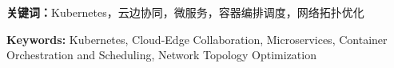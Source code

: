 \cleardoublepage
{}


\textbf{关键词：}Kubernetes，云边协同，微服务，容器编排调度，网络拓扑优化

\cleardoublepage
{}


\textbf{Keywords:} Kubernetes, Cloud-Edge Collaboration, Microservices, Container Orchestration and Scheduling, Network Topology Optimization